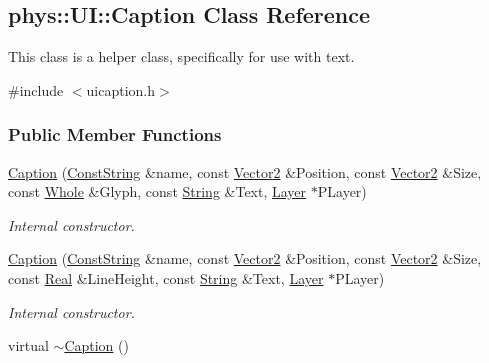 \hypertarget{classphys_1_1UI_1_1Caption}{
\subsection{phys::UI::Caption Class Reference}
\label{classphys_1_1UI_1_1Caption}
}


This class is a helper class, specifically for use with text.  




{\ttfamily \#include $<$uicaption.h$>$}

\subsubsection*{Public Member Functions}
\begin{DoxyCompactItemize}
\item 
\hyperlink{classphys_1_1UI_1_1Caption_a49873b9d0e566c95dc4c823a1c409e93}{Caption} (\hyperlink{namespacephys_a5ce5049f8b4bf88d6413c47b504ebb31}{ConstString} \&name, const \hyperlink{classphys_1_1Vector2}{Vector2} \&Position, const \hyperlink{classphys_1_1Vector2}{Vector2} \&Size, const \hyperlink{namespacephys_a460f6bc24c8dd347b05e0366ae34f34a}{Whole} \&Glyph, const \hyperlink{namespacephys_aa03900411993de7fbfec4789bc1d392e}{String} \&Text, \hyperlink{classphys_1_1UI_1_1Layer}{Layer} $\ast$PLayer)
\begin{DoxyCompactList}\small\item\em Internal constructor. \item\end{DoxyCompactList}\item 
\hyperlink{classphys_1_1UI_1_1Caption_a427d4ac90877112b2dbf262f7d384d77}{Caption} (\hyperlink{namespacephys_a5ce5049f8b4bf88d6413c47b504ebb31}{ConstString} \&name, const \hyperlink{classphys_1_1Vector2}{Vector2} \&Position, const \hyperlink{classphys_1_1Vector2}{Vector2} \&Size, const \hyperlink{namespacephys_af7eb897198d265b8e868f45240230d5f}{Real} \&LineHeight, const \hyperlink{namespacephys_aa03900411993de7fbfec4789bc1d392e}{String} \&Text, \hyperlink{classphys_1_1UI_1_1Layer}{Layer} $\ast$PLayer)
\begin{DoxyCompactList}\small\item\em Internal constructor. \item\end{DoxyCompactList}\item 
\hypertarget{classphys_1_1UI_1_1Caption_a5443ce0c7c7dc4b4f1c56b124e092a98}{
virtual \hyperlink{classphys_1_1UI_1_1Caption_a5443ce0c7c7dc4b4f1c56b124e092a98}{$\sim$Caption} ()}
\label{classphys_1_1UI_1_1Caption_a5443ce0c7c7dc4b4f1c56b124e092a98}


\end{DoxyCompactItemize}
